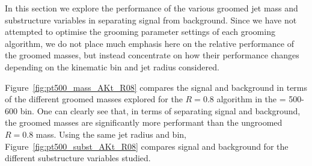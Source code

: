 In this section we  explore the performance of the various groomed
jet mass and substructure variables in separating signal
from background.
Since we
have not attempted to optimise the grooming parameter settings of
each grooming algorithm, we do not place much emphasis
here on the relative performance of the groomed masses, but instead
concentrate on how their performance changes depending on the
kinematic bin and jet radius considered. 

Figure~\ref{fig:pt500_mass_AKt_R08}  compares the signal and
background in terms of the different groomed masses explored for the
\antikt $R=0.8$ algorithm in the \pt = 500-600 \GeV bin. One can clearly see
that, in terms of separating signal and background, the groomed masses
are significantly more performant than the ungroomed \antikt $R=0.8$
mass. Using the same jet radius and \pt bin, Figure~\ref{fig:pt500_subst_AKt_R08}
compares signal and background for the different substructure variables
studied. 

